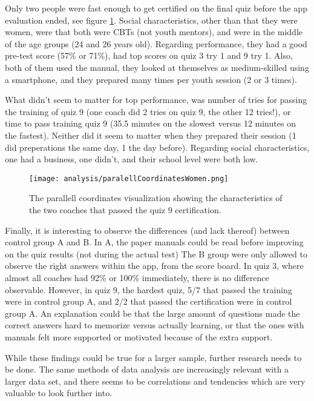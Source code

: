 Only two people were fast enough to get certified on the final quiz before the app evaluation ended, see figure \ref{fig:quiz9pl}. Social characteristics, other than that they were women, were that both were CBTs (not youth mentors), and were in the middle of the age groups (24 and 26 years old). Regarding performance, they had a good pre-test score (57\% or 71\%), had top scores on quiz 3 try 1 and 9 try 1. Also, both of them used the manual, they looked at themselves as medium-skilled using a smartphone, and they prepared many times per youth session (2 or 3 times).

What didn't seem to matter for top performance, was number of tries for passing the training of quiz 9 (one coach did 2 tries on quiz 9, the other 12 tries!), or time to pass training quiz 9 (35.5 minutes on the slowest versus 12 minutes on the fastest). Neither did it seem to matter when they prepared their session (1 did preperations the same day, 1 the day before). Regarding social characteristics, one had a business, one didn't, and their school level were both low.

\begin{figure}[h]
    \centering
    \texttt{[image: analysis/paralellCoordinatesWomen.png]}
    \caption{The parallell coordinates visualization showing the characteristics of the two coaches that passed the quiz 9 certification.}
    \label{fig:quiz9pl}
\end{figure}

Finally, it is interesting to observe the differences (and lack thereof) between control group A and B. In A, the paper manuals could be read before improving on the quiz results (not during the actual test) The B group were only allowed to observe the right answers within the app, from the score board. In quiz 3, where almost all coaches had 92\% or 100\% immediately, there is no difference observable. However, in quiz 9, the hardest quiz, 5/7 that passed the training were in control group A, and 2/2 that passed the certification were in control group A. An explanation could be that the large amount of questions made the correct answers hard to memorize versus actually learning, or that the ones with manuals felt more supported or motivated because of the extra support.

While these findings could be true for a larger sample, further research needs to be done. The same methods of data analysis are increasingly relevant with a larger data set, and there seems to be correlations and tendencies which are very valuable to look further into.
